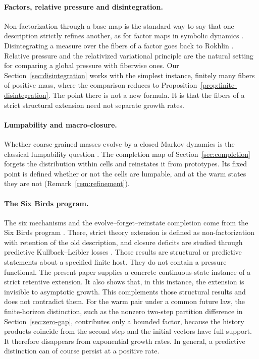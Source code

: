 \paragraph{Factors, relative pressure and disintegration.}
Non-factorization through a base map is the standard way to say that one description strictly refines another, as for factor maps in symbolic dynamics \cite{LindMarcus1995SymbolicDynamics}. Disintegrating a measure over the fibers of a factor goes back to Rokhlin \cite{Rokhlin1949FundamentalIdeas}. Relative pressure and the relativized variational principle \cite{LedrappierWalters1977RelativisedVP,Walters1986RelativePressure} are the natural setting for comparing a global pressure with fiberwise ones. Our Section~\ref{sec:disintegration} works with the simplest instance, finitely many fibers of positive mass, where the comparison reduces to Proposition~\ref{prop:finite-disintegration}. The point there is not a new formula. It is that the fibers of a strict structural extension need not separate growth rates.

\paragraph{Lumpability and macro-closure.}
Whether coarse-grained masses evolve by a closed Markov dynamics is the classical lumpability question \cite{KemenySnell1976FiniteMarkovChains}. The completion map of Section~\ref{sec:completion} forgets the distribution within cells and reinstates it from prototypes. Its fixed point is defined whether or not the cells are lumpable, and at the warm states they are not (Remark~\ref{rem:refinement}).

\paragraph{The Six Birds program.}
The six mechanisms and the evolve--forget--reinstate completion come from the Six Birds program \cite{TsiokosFoundations,TsiokosCreateStone}. There, strict theory extension is defined as non-factorization with retention of the old description, and closure deficits are studied through predictive Kullback--Leibler losses \cite{TsiokosCastStone,CoverThomas2006InfoTheory}. Those results are structural or predictive statements about a specified finite host. They do not contain a pressure functional. The present paper supplies a concrete continuous-state instance of a strict retentive extension. It also shows that, in this instance, the extension is invisible to asymptotic growth. This complements those structural results and does not contradict them. For the warm pair under a common future law, the finite-horizon distinction, such as the nonzero two-step partition difference in Section~\ref{sec:zero-gap}, contributes only a bounded factor, because the history products coincide from the second step and the initial vectors have full support. It therefore disappears from exponential growth rates. In general, a predictive distinction can of course persist at a positive rate.

